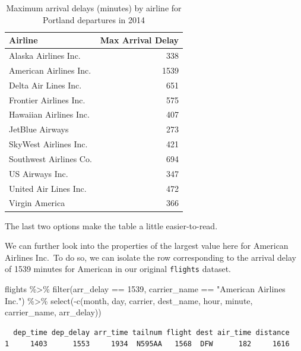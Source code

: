 \documentclass[
  letterpaper,
  12pt,
  twoside]{reedthesis}
\newenvironment{Shaded}{\begin{snugshade}}{\end{snugshade}}
\newcommand{\DecValTok}[1]{\textcolor[rgb]{0.68,0.00,0.00}{#1}}
\newcommand{\FunctionTok}[1]{\textcolor[rgb]{0.28,0.35,0.67}{#1}}
\newcommand{\NormalTok}[1]{\textcolor[rgb]{0.00,0.23,0.31}{#1}}
\newcommand{\SpecialCharTok}[1]{\textcolor[rgb]{0.37,0.37,0.37}{#1}}
\newcommand{\StringTok}[1]{\textcolor[rgb]{0.13,0.47,0.30}{#1}}
\begin{document}
\begin{longtable}[]{@{}lr@{}}

\caption{\label{tbl-maxdelays}Maximum arrival delays (minutes) by
airline for Portland departures in 2014}

\tabularnewline

\toprule\noalign{}
Airline & Max Arrival Delay \\
\midrule\noalign{}
\endhead
\bottomrule\noalign{}
\endlastfoot
Alaska Airlines Inc. & 338 \\
American Airlines Inc. & 1539 \\
Delta Air Lines Inc. & 651 \\
Frontier Airlines Inc. & 575 \\
Hawaiian Airlines Inc. & 407 \\
JetBlue Airways & 273 \\
SkyWest Airlines Inc. & 421 \\
Southwest Airlines Co. & 694 \\
US Airways Inc. & 347 \\
United Air Lines Inc. & 472 \\
Virgin America & 366 \\

\end{longtable}

The last two options make the table a little easier-to-read.

We can further look into the properties of the largest value here for
American Airlines Inc.~To do so, we can isolate the row corresponding to
the arrival delay of 1539 minutes for American in our original
\texttt{flights} dataset.

\begin{Shaded}
\begin{Highlighting}[]
\NormalTok{flights }\SpecialCharTok{\%\textgreater{}\%}
  \FunctionTok{filter}\NormalTok{(arr\_delay }\SpecialCharTok{==} \DecValTok{1539}\NormalTok{,}
\NormalTok{         carrier\_name }\SpecialCharTok{==} \StringTok{"American Airlines Inc."}\NormalTok{) }\SpecialCharTok{\%\textgreater{}\%}
  \FunctionTok{select}\NormalTok{(}\SpecialCharTok{{-}}\FunctionTok{c}\NormalTok{(month, day, carrier, dest\_name, hour,}
\NormalTok{            minute, carrier\_name, arr\_delay))}
\end{Highlighting}
\end{Shaded}

\begin{verbatim}
  dep_time dep_delay arr_time tailnum flight dest air_time distance
1     1403      1553     1934  N595AA   1568  DFW      182     1616
\end{verbatim}
\end{document}
